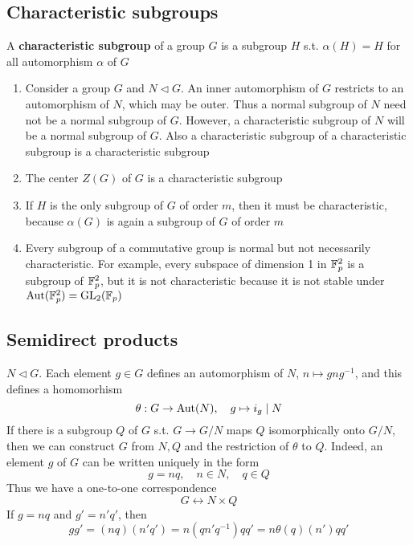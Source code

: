 \documentclass[11pt]{article}
\begin{document}
\subsection{Characteristic subgroups}
\label{sec:orge9d4af1}
\begin{definition}[]
A \textbf{characteristic subgroup} of a group \(G\) is a subgroup \(H\) s.t. \(\alpha(H)=H\) for all
automorphism \(\alpha\) of \(G\)
\end{definition}

\begin{remark}
\begin{enumerate}
\item Consider a group \(G\) and \(N\lhd G\). An inner automorphism of \(G\) restricts to an
automorphism of \(N\), which may be outer. Thus a normal subgroup of \(N\) need not be a
normal subgroup of \(G\). However, a characteristic subgroup of \(N\) will be a normal
subgroup of \(G\). Also a characteristic subgroup of a characteristic subgroup is a
characteristic subgroup
\item The center \(Z(G)\) of \(G\) is a characteristic subgroup
\item If \(H\) is the only subgroup of \(G\) of order \(m\), then it must be characteristic,
because \(\alpha(G)\) is again a subgroup of \(G\) of order \(m\)
\item Every subgroup of a commutative group is normal but not necessarily characteristic. For
example, every subspace of dimension 1 in \(\mathbb{F}_p^2\) is a subgroup of \(\mathbb{F}_p^2\), but it is not
characteristic because it is not stable under \(\operatorname{\text{Aut}}(\mathbb{F}_p^2)=\operatorname{GL}_2(\mathbb{F}_p)\)
\end{enumerate}
\end{remark}
\subsection{Semidirect products}
\label{sec:org8d49579}
\(N\lhd G\). Each element \(g\in G\) defines an automorphism of \(N\), \(n\mapsto gng^{-1}\), and this
defines a homomorhism
\begin{equation*}
\theta:G\to\operatorname{\text{Aut}}(N),\quad g\mapsto i_g\mid N
\end{equation*}
If there is a subgroup \(Q\) of \(G\) s.t. \(G\to G/N\) maps \(Q\) isomorphically onto \(G/N\),
then we can construct \(G\) from \(N,Q\) and the restriction of \(\theta\) to \(Q\). Indeed, an
element \(g\) of \(G\) can be written uniquely in the form
\begin{equation*}
g=nq,\quad n\in N,\quad q\in Q
\end{equation*}
Thus we have a one-to-one correspondence
\begin{equation*}
G\leftrightarrow N\times Q
\end{equation*}
If \(g=nq\) and \(g'=n'q'\), then
\begin{equation*}
gg'=(nq)(n'q')=n(qn'q^{-1})qq'=n\theta(q)(n')qq'
\end{equation*}
\end{document}
